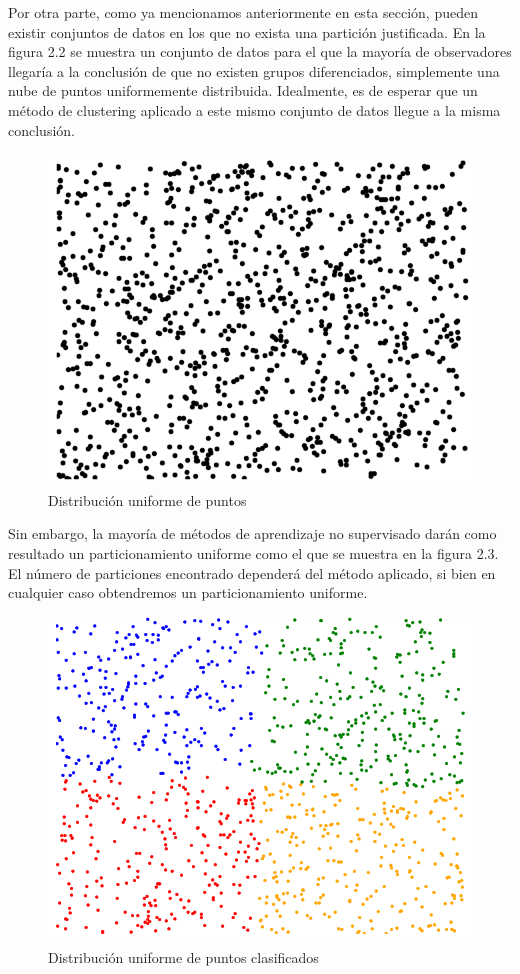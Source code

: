Por otra parte, como ya mencionamos anteriormente en esta sección, pueden existir conjuntos de datos en los que no exista una partición justificada. En la figura 2.2 se muestra un conjunto de datos para el que la mayoría de observadores llegaría a la conclusión de que no existen grupos diferenciados, simplemente una nube de puntos uniformemente distribuida. Idealmente, es de esperar que un método de clustering aplicado a este mismo conjunto de datos llegue a la misma conclusión.

\begin{figure}[!h]
	\centering
	\includegraphics[scale=0.2]{imagenes/c2/rand.png} 
	\caption{Distribución uniforme de puntos}\label{fig:figure2}
\end{figure}

Sin embargo, la mayoría de métodos de aprendizaje no supervisado darán como resultado un particionamiento uniforme como el que se muestra en la figura 2.3. El número de particiones encontrado dependerá del método aplicado, si bien en cualquier caso obtendremos un particionamiento uniforme.

\begin{figure}[!h]
	\centering
	\includegraphics[scale=0.2]{imagenes/c2/randClasif.png} 
	\caption{Distribución uniforme de puntos clasificados}\label{fig:figure3}
\end{figure}

